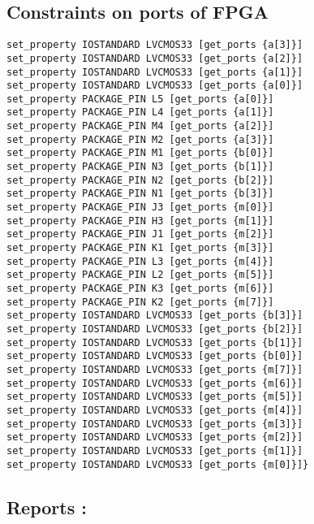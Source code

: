 \subsection*{Constraints on ports of FPGA }
\begin{verbatim}
set_property IOSTANDARD LVCMOS33 [get_ports {a[3]}]
set_property IOSTANDARD LVCMOS33 [get_ports {a[2]}]
set_property IOSTANDARD LVCMOS33 [get_ports {a[1]}]
set_property IOSTANDARD LVCMOS33 [get_ports {a[0]}]
set_property PACKAGE_PIN L5 [get_ports {a[0]}]
set_property PACKAGE_PIN L4 [get_ports {a[1]}]
set_property PACKAGE_PIN M4 [get_ports {a[2]}]
set_property PACKAGE_PIN M2 [get_ports {a[3]}]
set_property PACKAGE_PIN M1 [get_ports {b[0]}]
set_property PACKAGE_PIN N3 [get_ports {b[1]}]
set_property PACKAGE_PIN N2 [get_ports {b[2]}]
set_property PACKAGE_PIN N1 [get_ports {b[3]}]
set_property PACKAGE_PIN J3 [get_ports {m[0]}]
set_property PACKAGE_PIN H3 [get_ports {m[1]}]
set_property PACKAGE_PIN J1 [get_ports {m[2]}]
set_property PACKAGE_PIN K1 [get_ports {m[3]}]
set_property PACKAGE_PIN L3 [get_ports {m[4]}]
set_property PACKAGE_PIN L2 [get_ports {m[5]}]
set_property PACKAGE_PIN K3 [get_ports {m[6]}]
set_property PACKAGE_PIN K2 [get_ports {m[7]}]
set_property IOSTANDARD LVCMOS33 [get_ports {b[3]}]
set_property IOSTANDARD LVCMOS33 [get_ports {b[2]}]
set_property IOSTANDARD LVCMOS33 [get_ports {b[1]}]
set_property IOSTANDARD LVCMOS33 [get_ports {b[0]}]
set_property IOSTANDARD LVCMOS33 [get_ports {m[7]}]
set_property IOSTANDARD LVCMOS33 [get_ports {m[6]}]
set_property IOSTANDARD LVCMOS33 [get_ports {m[5]}]
set_property IOSTANDARD LVCMOS33 [get_ports {m[4]}]
set_property IOSTANDARD LVCMOS33 [get_ports {m[3]}]
set_property IOSTANDARD LVCMOS33 [get_ports {m[2]}]
set_property IOSTANDARD LVCMOS33 [get_ports {m[1]}]
set_property IOSTANDARD LVCMOS33 [get_ports {m[0]}]}

\end{verbatim}

\subsection*{Reports :}

